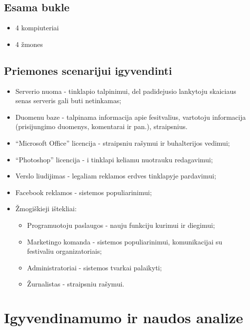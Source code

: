 ﻿\documentclass{VUMIFPSkursinis}
\begin{document}
\subsection{Esama bukle}
\begin{itemize}
	\item 4 kompiuteriai
	\item 4 žmones
\end{itemize}

\subsection{Priemones scenarijui igyvendinti}
\begin{itemize}
\item Serverio nuoma - tinklapio talpinimui, del padidejusio lankytoju skaiciaus senas serveris gali buti netinkamas;
\item Duomenu baze - talpinama informacija apie fesitvalius, vartotoju informacija (prisijungimo duomenys, komentarai ir pan.), straipsnius.
\item “Microsoft Office” licencija - straipsniu rašymui ir buhalterijos vedimui;
\item “Photoshop” licencija - i tinklapi keliamu nuotrauku redagavimui;
\item Verslo liudijimas - legaliam reklamos erdves tinklapyje pardavimui;
\item Facebook reklamos - sistemos populiarinimui;
\item Žmogiškieji ištekliai:
    \begin{itemize}
    \item Programuotoju paslaugos - nauju funkciju kurimui ir diegimui;
    \item Marketingo komanda - sistemos populiarinimui, komunikacijai su festivaliu organizatoriais;
    \item Administratoriai - sistemos tvarkai palaikyti;
    \item Žurnalistas - straipsniu rašymui.
    \end{itemize}
\end{itemize}

\section{Igyvendinamumo ir naudos analize}
\end{document}

